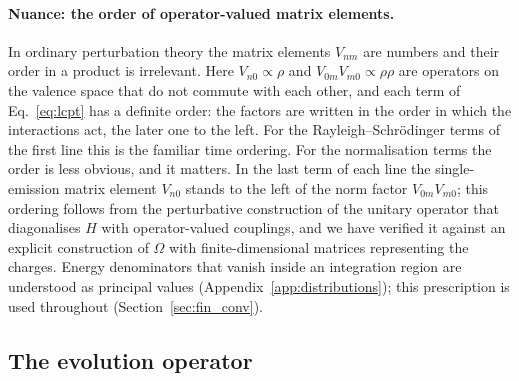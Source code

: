 \paragraph{Nuance: the order of operator-valued matrix elements.} In ordinary perturbation theory the matrix elements $V_{nm}$ are numbers and their order in a product is irrelevant. Here $V_{n0}\propto\rho$ and $V_{0m}V_{m0}\propto\rho\rho$ are operators on the valence space that do not commute with each other, and each term of Eq.~\eqref{eq:lcpt} has a definite order: the factors are written in the order in which the interactions act, the later one to the left. For the Rayleigh--Schr\"odinger terms of the first line this is the familiar time ordering. For the normalisation terms the order is less obvious, and it matters. In the last term of each line the single-emission matrix element $V_{n0}$ stands to the left of the norm factor $V_{0m}V_{m0}$; this ordering follows from the perturbative construction of the unitary operator that diagonalises $H$ with operator-valued couplings, and we have verified it against an explicit construction of $\Omega$ with finite-dimensional matrices representing the charges. Energy denominators that vanish inside an integration region are understood as principal values (Appendix~\ref{app:distributions}); this prescription is used throughout (Section~\ref{sec:fin_conv}).

\subsection{The evolution operator}\label{sec:omega}

